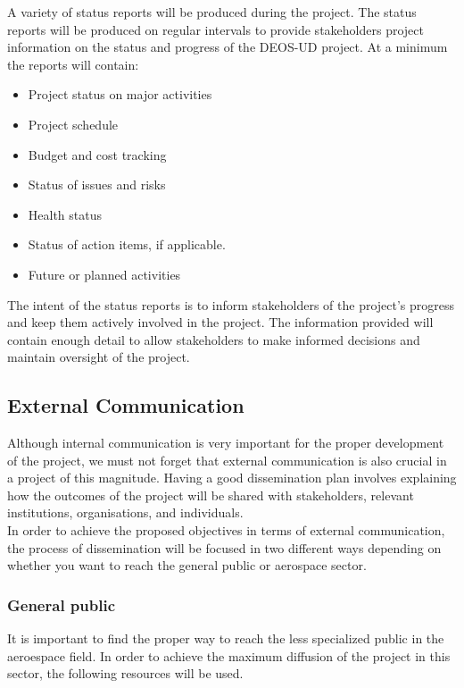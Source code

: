 A variety of status reports will be produced during the project. The status reports will be produced on regular intervals to provide stakeholders project information on the status and progress of the DEOS-UD project. At a minimum the reports will contain:
 \begin{itemize}
	\item Project status on major activities
	\item Project schedule
	\item Budget and cost tracking
	\item Status of issues and risks
	\item Health status	
	\item Status of action items, if applicable.
	\item Future or planned activities 
 \end{itemize}

The intent of the status reports is to inform stakeholders of the project’s progress and keep them actively involved in the project. The information provided will contain enough detail to allow stakeholders to make informed decisions and maintain oversight of the project.

\subsection{External Communication}

Although internal communication is very important for the proper development of the project, we must not forget that external communication is also crucial in a project of this magnitude. Having a good dissemination plan involves explaining how the outcomes of the project will be shared with stakeholders, relevant institutions, organisations, and individuals. \\
In order to achieve the proposed objectives in terms of external communication, the process of dissemination will be focused  in two different ways depending on whether you want to reach the general public or aerospace sector.

\subsubsection{General public}

It is important to find the proper way to reach the less specialized public in the aeroespace field. In order to achieve the maximum diffusion of the project in this sector,  the following resources will be used.

